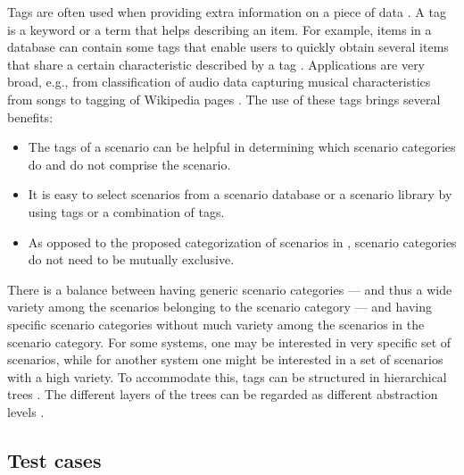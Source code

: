 Tags are often used when providing extra information on a piece of data \autocite{smith2007tagging}. A tag is a keyword or a term that helps describing an item. For example, items in a database can contain some tags that enable users to quickly obtain several items that share a certain characteristic described by a tag \autocite{craft2004tagging}. 
Applications are very broad, e.g., from classification of audio data \autocite{kong2017joint} capturing musical characteristics from songs \autocite{ellis2011semantic} to tagging of Wikipedia pages \autocite{voss2006collaborative}.
The use of these tags brings several benefits:
\begin{itemize}
	\item The tags of a scenario can be helpful in determining which scenario categories do and do not comprise the scenario.
	\item It is easy to select scenarios from a scenario database or a scenario library by using tags or a combination of tags.
	\item As opposed to the proposed categorization of scenarios in \autocite{opdencamp2014cats, USDoT2007precrashscenarios, lenard2014typical, lara2019harmonized, lara2019harmonized}, scenario categories do not need to be mutually exclusive.
\end{itemize}

There is a balance between having generic scenario categories --- and thus a wide variety among the scenarios belonging to the scenario category --- and having specific scenario categories without much variety among the scenarios in the scenario category. For some systems, one may be interested in very specific set of scenarios, while for another system one might be interested in a set of scenarios with a high variety. To accommodate this, tags can be structured in hierarchical trees \autocite{molloy2017dynamic}. The different layers of the trees can be regarded as different abstraction levels \autocite{Bonnin2014}. 




\subsection{Test cases}
\label{sec:test cases}

